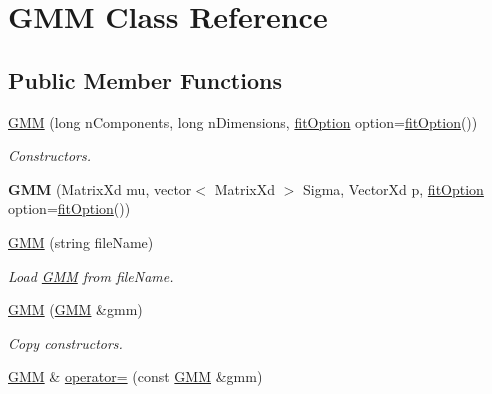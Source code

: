 \hypertarget{class_g_m_m}{\section{G\+M\+M Class Reference}
\label{class_g_m_m}
}
\subsection*{Public Member Functions}
\begin{DoxyCompactItemize}
\item 
\hypertarget{class_g_m_m_a780eb798b963d64324e60f8a05511793}{\hyperlink{class_g_m_m_a780eb798b963d64324e60f8a05511793}{G\+M\+M} (long n\+Components, long n\+Dimensions, \hyperlink{structfit_option}{fit\+Option} option=\hyperlink{structfit_option}{fit\+Option}())}\label{class_g_m_m_a780eb798b963d64324e60f8a05511793}

\begin{DoxyCompactList}\small\item\em Constructors. \end{DoxyCompactList}\item 
\hypertarget{class_g_m_m_a204c0939ce8e0544a70f6bacac70430e}{{\bfseries G\+M\+M} (Matrix\+Xd mu, vector$<$ Matrix\+Xd $>$ Sigma, Vector\+Xd p, \hyperlink{structfit_option}{fit\+Option} option=\hyperlink{structfit_option}{fit\+Option}())}\label{class_g_m_m_a204c0939ce8e0544a70f6bacac70430e}

\item 
\hypertarget{class_g_m_m_a3fd2ad1e4b02532fbcc8c268f60b4ee8}{\hyperlink{class_g_m_m_a3fd2ad1e4b02532fbcc8c268f60b4ee8}{G\+M\+M} (string file\+Name)}\label{class_g_m_m_a3fd2ad1e4b02532fbcc8c268f60b4ee8}

\begin{DoxyCompactList}\small\item\em Load \hyperlink{class_g_m_m}{G\+M\+M} from file\+Name. \end{DoxyCompactList}\item 
\hypertarget{class_g_m_m_ae4a3fdfee01a1f37a58d405b701f1469}{\hyperlink{class_g_m_m_ae4a3fdfee01a1f37a58d405b701f1469}{G\+M\+M} (\hyperlink{class_g_m_m}{G\+M\+M} \&gmm)}\label{class_g_m_m_ae4a3fdfee01a1f37a58d405b701f1469}

\begin{DoxyCompactList}\small\item\em Copy constructors. \end{DoxyCompactList}\item 
\hypertarget{class_g_m_m_a60cc7218be23fa401a804b5d419632b9}{\hyperlink{class_g_m_m}{G\+M\+M} \& \hyperlink{class_g_m_m_a60cc7218be23fa401a804b5d419632b9}{operator=} (const \hyperlink{class_g_m_m}{G\+M\+M} \&gmm)}\label{class_g_m_m_a60cc7218be23fa401a804b5d419632b9}


\end{DoxyCompactItemize}
